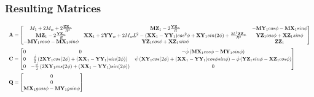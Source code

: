 \documentclass[a4paper,10pt]{article}
\newcommand\scalemath[2]{\scalebox{#1}{\mbox{\ensuremath{\displaystyle #2}}}}
\begin{document}
\subsubsection{Resulting Matrices}
\begin{align} \begin{split}
 &\scalemath{0.595}{\mathbf{A} = \left[ \begin{matrix} M_1+2M_w+2\frac{\mathbf{ZZ}_w}{R^2} & \mathbf{MZ}_1-2\frac{\mathbf{YZ}_w}{R} & -\mathbf{MY}_1cos\phi-\mathbf{MX}_1sin\phi \\ 
   \mathbf{MZ}_1-2\frac{\mathbf{YZ}_w}{R} & \mathbf{XX}_1+2\mathbf{YY}_w+2M_wL^2-(\mathbf{XX}_1-\mathbf{YY}_1)cos^2\phi+\mathbf{XY}_1sin(2\phi)+\frac{2L^2\mathbf{ZZ}_w}{R^2} & \mathbf{YZ}_1cos\phi+\mathbf{XZ}_1sin\phi \\
   -\mathbf{MY}_1cos\phi-\mathbf{MX}_1sin\phi & \mathbf{YZ}_1cos\phi+\mathbf{XZ}_1sin\phi  & \mathbf{ZZ}_1 \end{matrix} \right]} \\
  &\scalemath{0.595}{\mathbf{C} = \left[ \begin{matrix} 0 & 0 & -\dot{\phi}\left(\mathbf{MX}_1cos\phi-\mathbf{MY}_1sin\phi\right) \\ 
    0 & \frac{\dot{\phi}}{2}\left(2\mathbf{XY}_1cos(2\phi)+(\mathbf{XX}_1-\mathbf{YY}_1)sin(2\phi)\right) & \dot\psi\left(\mathbf{XY}_1cos(2\phi)+(\mathbf{XX}_1-\mathbf{YY}_1)cos\phi sin\phi\right)-\dot\phi\left(\mathbf{YZ}_1sin\phi-\mathbf{XZ}_1cos\phi\right) \\ 
    0 & -\frac{\dot{\psi}}{2}\left(2\mathbf{XY}_1cos(2\phi)+(\mathbf{XX}_1-\mathbf{YY}_1)sin(2\phi)\right) & 0 \end{matrix} \right]} \\
 &\scalemath{0.595}{\mathbf{Q} = \left[ \begin{matrix} 0 \\ 0 \\ \mathbf{MX}_1gcos\phi - \mathbf{MY}_1gsin\phi \end{matrix} \right]}
\end{split} \end{align}
\end{document}
